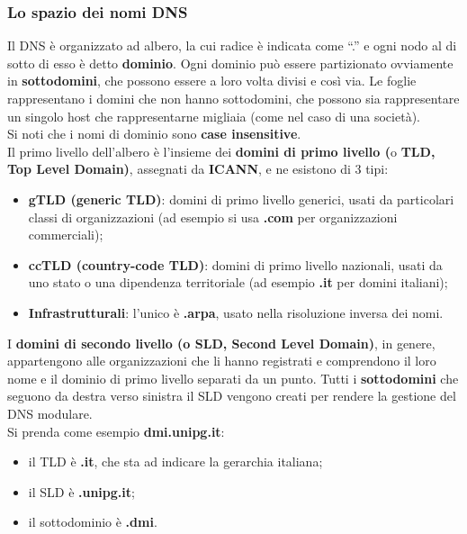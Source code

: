         \subsubsection{Lo spazio dei nomi DNS}


            Il DNS è organizzato ad albero, la cui radice è indicata come “.” e ogni nodo al di sotto 
            di esso è detto \textbf{dominio}. Ogni dominio può essere partizionato ovviamente in \textbf{sottodomini},
             che possono essere a loro volta divisi e così via. Le foglie rappresentano i domini che non hanno sottodomini, che possono sia
            rappresentare un singolo host che rappresentarne migliaia (come nel caso di una società).\\

            Si noti che i nomi di dominio sono \textbf{case insensitive}.\\

            Il primo livello dell’albero è l’insieme dei \textbf{domini di primo livello (}o \textbf{TLD, Top Level Domain)},
            assegnati da \textbf{ICANN}, e ne esistono di 3 tipi:

            \begin{itemize}
                \item \textbf{gTLD (generic TLD)}: domini di primo livello generici, usati da particolari classi di
                organizzazioni (ad esempio si usa \textbf{.com} per organizzazioni commerciali);
                \item \textbf{ccTLD (country-code TLD)}: domini di primo livello nazionali, usati da uno stato o una
                dipendenza territoriale (ad esempio \textbf{.it} per domini italiani);
                \item \textbf{Infrastrutturali}: l’unico è \textbf{.arpa}, usato nella risoluzione inversa dei nomi.
            \end{itemize}

            I \textbf{domini di secondo livello (o SLD, Second Level Domain)}, in genere, appartengono alle
            organizzazioni che li hanno registrati e comprendono il loro nome e il dominio di primo livello
            separati da un punto. Tutti i \textbf{sottodomini} che seguono da destra verso sinistra il SLD vengono
            creati per rendere la gestione del DNS modulare.\\

            Si prenda come esempio \textbf{dmi.unipg.it}:
            \begin{itemize}
                \item il TLD è \textbf{.it}, che sta ad indicare la gerarchia italiana;
                \item il SLD è \textbf{.unipg.it};
                \item il sottodominio è \textbf{.dmi}.
            \end{itemize}

